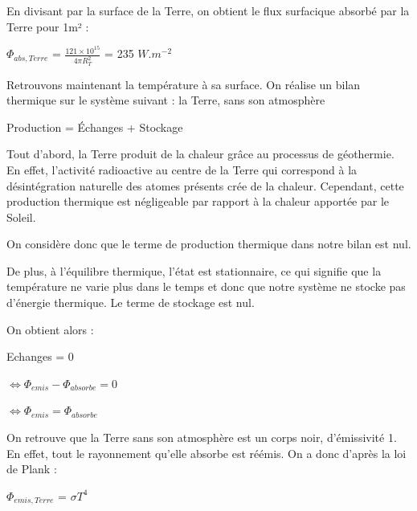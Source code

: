 \documentclass[a4paper, 12pt]{report} %
\begin{document}
En divisant par la surface de la Terre, 
on obtient le flux surfacique absorbé par la Terre pour 1m² :
\begin{center}
$\Phi_{abs,Terre}$ = $\frac {121 \times 10^{15}}{4 \pi R_T^{2}}$
= 235 $W.m^{-2}$
\end{center}

\par 
\vspace{\baselineskip}
\vspace{\baselineskip}

Retrouvons maintenant la température à sa surface.
On réalise un bilan thermique sur le système suivant : 
la Terre, sans son atmosphère
\begin{center}
    Production = Échanges + Stockage 
\end{center} \vspace{\baselineskip}

Tout d'abord, la Terre produit de la chaleur grâce au processus de géothermie. En effet, l’activité radioactive au centre de la Terre qui correspond à la désintégration naturelle des atomes présents crée de la chaleur. 
Cependant, cette production thermique est négligeable par rapport à la chaleur apportée par le Soleil. 

\noindent On considère donc que le terme de production thermique dans notre bilan est nul. \vspace{\baselineskip}

De plus, à l’équilibre thermique, l’état est stationnaire, ce qui signifie que la température ne varie plus dans le temps et donc que notre système ne stocke pas d’énergie thermique. Le terme de stockage est nul.

\noindent On obtient alors :
\begin{center}
    Echanges = 0
\end{center}

\begin{center}
    $\Leftrightarrow \Phi_{emis} - \Phi_{absorbe}  = 0$
\end{center}

\begin{center}
    $\Leftrightarrow \Phi_{emis} = \Phi_{absorbe}$
\end{center} \vspace{\baselineskip}

On retrouve que la Terre sans son atmosphère est un corps noir, d’émissivité 1. En effet, tout le rayonnement qu’elle absorbe est réémis. On a donc d'après la loi de Plank :
\begin{center}
$\Phi_{emis,Terre}$ = $\sigma T^{4}$
\end{center} \vspace{\baselineskip}
\end{document}
